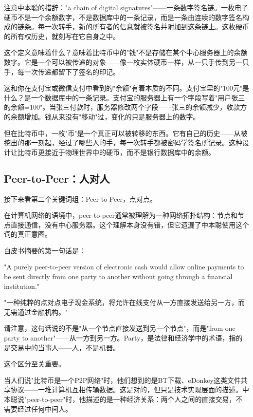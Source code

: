 \documentclass[a4paper,12pt,openany]{ctexbook}
\newenvironment{quoting}{%
  \par\vspace{0.5em}%
  \begin{list}{}{%
    \setlength{\leftmargin}{2em}%
    \setlength{\rightmargin}{2em}%
    \setlength{\parsep}{0.3em}%
    \setlength{\itemsep}{0pt}%
    \setlength{\topsep}{0pt}%
  }%
  \item\relax
}{%
  \end{list}%
  \par\vspace{0.5em}%
}
\begin{document}
注意中本聪的措辞："a chain of digital signatures"——一条数字签名链。一枚电子硬币不是一个余额数字，不是数据库中的一条记录，而是一条由连续的数字签名构成的链条。每一次转手，新的所有者的信息就被签名并附加到这条链上。这枚硬币的所有权历史，就刻写在它自身之中。

这个定义意味着什么？意味着比特币中的"钱"不是存储在某个中心服务器上的余额数字。它是一个可以被传递的对象——像一枚实体硬币一样，从一只手传到另一只手，每一次传递都留下了签名的印记。

这和你在支付宝或微信支付中看到的"余额"有着本质的不同。支付宝里的"100元"是什么？是一个数据库中的一条记录。支付宝的服务器上有一个字段写着"用户张三的余额=100"。当张三付款时，服务器修改两个字段——张三的余额减少，收款方的余额增加。钱从来没有"移动"过，变化的只是服务器上的数字。

但在比特币中，一枚"币"是一个真正可以被转移的东西。它有自己的历史——从被挖出的那一刻起，经过了哪些人的手，每一次转手都被密码学签名所记录。这种设计让比特币更接近于物理世界中的硬币，而不是银行数据库中的余额。


\subsection*{Peer-to-Peer：人对人}


接下来看第二个关键词组：Peer-to-Peer，点对点。

在计算机网络的语境中，peer-to-peer通常被理解为一种网络拓扑结构：节点和节点直接通信，没有中心服务器。这个理解本身没有错，但它遗漏了中本聪使用这个词的真正意图。

白皮书摘要的第一句话是：


\begin{quoting}
\small
"A purely peer-to-peer version of electronic cash would allow online payments to be sent directly from one party to another without going through a financial institution."

"一种纯粹的点对点电子现金系统，将允许在线支付从一方直接发送给另一方，而无需通过金融机构。"
\end{quoting}


请注意，这句话说的不是"从一个节点直接发送到另一个节点"，而是"from one party to another"——从一方到另一方。Party，是法律和经济学中的术语，指的是交易中的当事人——人，不是机器。

这个区分至关重要。

当人们说"比特币是一个P2P网络"时，他们想到的是BT下载、eDonkey这类文件共享协议——一堆计算机互相传输数据。这是对的，但只是技术实现层面的描述。中本聪说"peer-to-peer"时，他描述的是一种经济关系：两个人之间的直接交易，不需要经过任何中间人。
\end{document}
